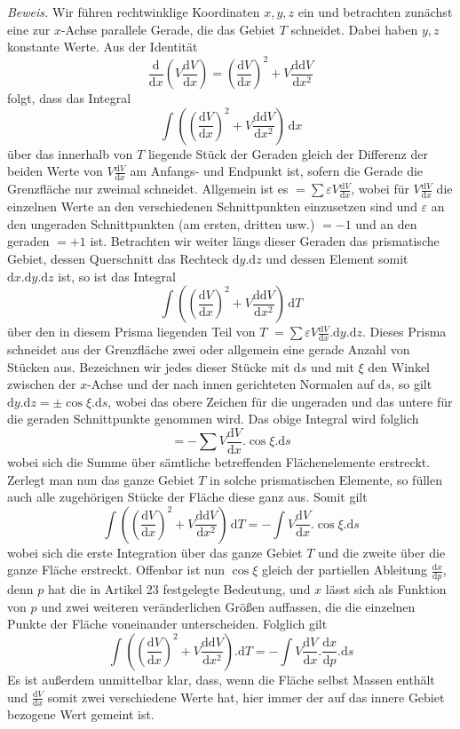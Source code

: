 \textit{Beweis.} Wir führen rechtwinklige Koordinaten $x,y,z$ ein und betrachten zunächst eine zur $x$-Achse parallele Gerade, die das Gebiet $T$ schneidet. Dabei haben $y,z$ konstante Werte. Aus der Identität
\[
\frac{\mathrm d}{\mathrm dx}(V\frac{\mathrm dV}{\mathrm dx})=(\frac{\mathrm dV}{\mathrm dx})^2+V\frac{\mathrm d\mathrm dV}{\mathrm dx^2}
\]
folgt, dass das Integral
\[
\int((\frac{\mathrm dV}{\mathrm dx})^2+V\frac{\mathrm d\mathrm dV}{\mathrm dx^2})\,\mathrm dx
\]
über das innerhalb von $T$ liegende Stück der Geraden gleich der Differenz der beiden Werte von $V\frac{\mathrm dV}{\mathrm dx}$ am Anfangs- und Endpunkt ist, sofern die Gerade die Grenzfläche nur zweimal schneidet. Allgemein ist es $=\sum\varepsilon V\frac{\mathrm dV}{\mathrm dx}$, wobei für $V\frac{\mathrm dV}{\mathrm dx}$ die einzelnen Werte an den verschiedenen Schnittpunkten einzusetzen sind und $\varepsilon$ an den ungeraden Schnittpunkten (am ersten, dritten usw.) $=-1$ und an den geraden $=+1$ ist. Betrachten wir weiter längs dieser Geraden das prismatische Gebiet, dessen Querschnitt das Rechteck $\mathrm dy.\mathrm dz$ und dessen Element somit $\mathrm dx.\mathrm dy.\mathrm dz$ ist, so ist das Integral
\[
\int((\frac{\mathrm dV}{\mathrm dx})^2+V\frac{\mathrm d\mathrm dV}{\mathrm dx^2})\,\mathrm dT
\]
über den in diesem Prisma liegenden Teil von $T$ $=\sum\varepsilon V\frac{\mathrm dV}{\mathrm dx}.\mathrm dy.\mathrm dz$. Dieses Prisma schneidet aus der Grenzfläche zwei oder allgemein eine gerade Anzahl von Stücken aus. Bezeichnen wir jedes dieser Stücke mit $\mathrm ds$ und mit $\xi$ den Winkel zwischen der $x$-Achse und der nach innen gerichteten Normalen auf $\mathrm ds$, so gilt $\mathrm dy.\mathrm dz=\pm\cos\xi.\mathrm ds$, wobei das obere Zeichen für die ungeraden und das untere für die geraden Schnittpunkte genommen wird. Das obige Integral wird folglich
\[
=-\sum V\frac{\mathrm dV}{\mathrm dx}.\cos\xi.\mathrm ds
\]
wobei sich die Summe über sämtliche betreffenden Flächenelemente erstreckt. Zerlegt man nun das ganze Gebiet $T$ in solche prismatischen Elemente, so füllen auch alle zugehörigen Stücke der Fläche diese ganz aus. Somit gilt
\[
\int((\frac{\mathrm dV}{\mathrm dx})^2+V\frac{\mathrm d\mathrm dV}{\mathrm dx^2})\,\mathrm dT=-\int V\frac{\mathrm dV}{\mathrm dx}.\cos\xi.\mathrm ds
\]
wobei sich die erste Integration über das ganze Gebiet $T$ und die zweite über die ganze Fläche erstreckt. Offenbar ist nun $\cos\xi$ gleich der partiellen Ableitung $\frac{\mathrm dx}{\mathrm dp}$, denn $p$ hat die in Artikel 23 festgelegte Bedeutung, und $x$ lässt sich als Funktion von $p$ und zwei weiteren veränderlichen Größen auffassen, die die einzelnen Punkte der Fläche voneinander unterscheiden. Folglich gilt
\[
\int((\frac{\mathrm dV}{\mathrm dx})^2+V\frac{\mathrm d\mathrm dV}{\mathrm dx^2}).\mathrm dT=-\int V\frac{\mathrm dV}{\mathrm dx}.\frac{\mathrm dx}{\mathrm dp}.\mathrm ds
\]
Es ist außerdem unmittelbar klar, dass, wenn die Fläche selbst Massen enthält und $\frac{\mathrm dV}{\mathrm dx}$ somit zwei verschiedene Werte hat, hier immer der auf das innere Gebiet bezogene Wert gemeint ist.

